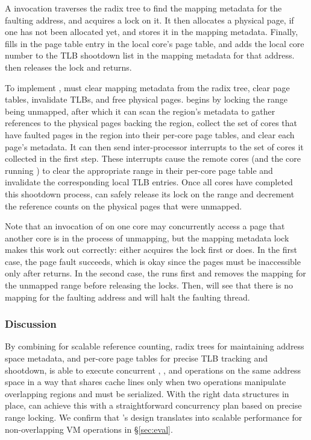 A  invocation traverses the radix tree to find the
mapping metadata for the faulting address, and acquires a lock on it.
It then allocates a physical page, if one has not been allocated yet, and
stores it in the mapping metadata.  Finally,  fills in the
page table entry in the local core's page table, and adds the local core
number to the TLB shootdown list in the mapping metadata for that address.
 then releases the lock and returns.

To implement , \vm must clear mapping metadata from the
radix tree, clear page tables, invalidate TLBs, and free physical
pages.   begins by locking the range being unmapped,
after which it can scan the region's metadata to gather references to
the physical pages backing the region, collect the set of cores that
have faulted pages in the region into their per-core page tables, and
clear each page's metadata.  It can then send inter-processor
interrupts to the set of cores it collected in the first step.  These
interrupts cause the remote cores (and the core running )
to clear the appropriate range in their per-core page table and
invalidate the corresponding local TLB entries.  Once all cores have
completed this shootdown process,  can safely release its
lock on the range and decrement the reference counts on the physical
pages that were unmapped.

Note that an invocation of  on one core may concurrently
access a page that another core is in the process of unmapping,
but the mapping metadata lock makes this work out correctly: either
 acquires the lock first or  does.  In the
first case, the page fault succeeds, which is okay since the pages must be
inaccessible only after  returns.  In the second case, the
 runs first and removes the mapping for the unmapped range
before releasing the locks. Then,  will see that there
is no mapping for the faulting address and will halt the faulting thread.

\subsubsection{Discussion}

By combining  for scalable reference counting, radix trees
for maintaining address space metadata, and per-core page tables for
precise TLB tracking and shootdown, \vm is able to execute concurrent
, , and  operations on the
same address space in a way that shares cache lines only when two operations
manipulate overlapping regions and must be serialized.  With the right
data structures in place, \vm can achieve this with a straightforward
concurrency plan based on precise range locking.  We confirm that
\vm's design translates into scalable performance for non-overlapping
VM operations in \S\ref{sec:eval}.

